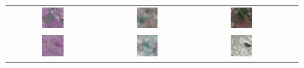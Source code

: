 \vspace{2em} 

\begin{figure}[h!]
    \centering
    \setlength{\tabcolsep}{2pt}
    \renewcommand{\arraystretch}{1.0}
    \begin{tabular}{c *{3}{c}}
        \includegraphics[width=0.25\textwidth]{img/seasons/spring/sample_000011_sar_pseudo.png} &
        \includegraphics[width=0.25\textwidth]{img/seasons/spring/sample_000011_pred_rgb.png} &
        \includegraphics[width=0.25\textwidth]{img/seasons/spring/sample_000011_true_rgb.png} \\
        
        \includegraphics[width=0.25\textwidth]{img/seasons/spring/sample_000008_sar_pseudo.png} &
        \includegraphics[width=0.25\textwidth]{img/seasons/spring/sample_000008_pred_rgb.png} &
        \includegraphics[width=0.25\textwidth]{img/seasons/spring/sample_000008_true_rgb.png} \\
        

\end{tabular}
\end{figure}
